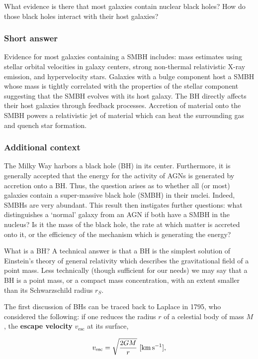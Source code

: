 \documentclass[a4paper,10pt]{article}
\begin{document}
What evidence is there that most galaxies contain nuclear black holes? How do those black holes interact with their host galaxies?

\subsubsection{Short answer}

Evidence for most galaxies containing a SMBH includes: mass estimates using stellar orbital velocities in galaxy centers, strong non-thermal relativistic X-ray emission, and hypervelocity stars. Galaxies with a bulge component host a SMBH whose mass is tightly correlated with the properties of the stellar component suggesting that the SMBH evolves with its host galaxy. The BH directly affects their host galaxies through feedback processes. Accretion of material onto the SMBH powers a relativistic jet of material which can heat the surrounding gas and quench star formation. 

\subsubsection{Additional context}

The Milky Way harbors a black hole (BH) in its center. Furthermore, it is generally accepted that the energy for the activity of AGNs is generated by accretion onto a BH. Thus, the question arises as to whether all (or most) galaxies contain a super-massive black hole (SMBH) in their nuclei. Indeed, SMBHs are very abundant. This result then instigates further questions: what distinguishes a `normal' galaxy from an AGN if both have a SMBH in the nucleus? Is it the mass of the black hole, the rate at which matter is accreted onto it, or the efficiency of the mechanism which is generating the energy?

{\noindent}What is a BH? A technical answer is that a BH is the simplest solution of Einstein’s theory of general relativity which describes the gravitational field of a point mass. Less technically (though sufficient for our needs) we may say that a BH is a point mass, or a compact mass concentration, with an extent smaller than its Schwarzschild radius $r_S$.

{\noindent}The first discussion of BHs can be traced back to Laplace in 1795, who considered the following: if one reduces the radius $r$ of a celestial body of mass $M$, the \textbf{escape velocity} $v_\mathrm{esc}$ at its surface,

\begin{align*}
    v_\mathrm{esc} = \sqrt{\frac{2GM}{r}} ~ [{\rm km\,s^{-1}}],
\end{align*}
\end{document}
